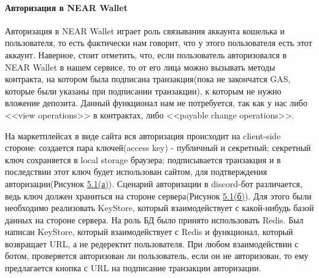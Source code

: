 \paragraph{Авторизация в NEAR Wallet}

Авторизация в NEAR Wallet играет роль связывания аккаунта кошелька и пользователя, то есть фактически нам говорит, что у этого пользователя есть этот аккаунт. Наверное, стоит отметить, что, если пользователь авторизовался в NEAR Wallet в нашем сервисе, то от его лица можно вызывать методы контракта, на котором была подписана транзакция(пока не закончатся GAS, которые были указаны при подписании транзакции), к которым не нужно вложение депозита. Данный функционал нам не потребуется, так как у нас либо <<view operations>> в контрактах, либо <<payable change operations>>.

На маркетплейсах в виде сайта вся авторизация происходит на client-side стороне: создается пара ключей(access key) - публичный и секретный; секретный ключ сохраняется в local storage браузера; подписывается транзакция и в последствии этот ключ будет использован сайтом, для подтверждения авторизации(Рисунок \hyperref[fig.nearauth.a]{\color{blue} 5.1(а)}). Сценарий авторизации в discord-бот различается, ведь ключ должен храниться на стороне сервера(Рисунок \hyperref[fig.nearauth.b]{\color{blue} 5.1(б)}). Для этого были необходимо реализовать KeyStore, который взаимодействует с какой-нибудь базой данных на стороне сервера. На роль БД было принято использовать Redis. Был написан KeyStore, который взаимодействует с Redis и функционал, который возвращает URL, а не редеректит пользователя. При любом взаимодействии с ботом, проверяется авторизован ли пользователь, если он не авторизован, то ему предлагается кнопка с URL на подписание транзакции авторизации.

